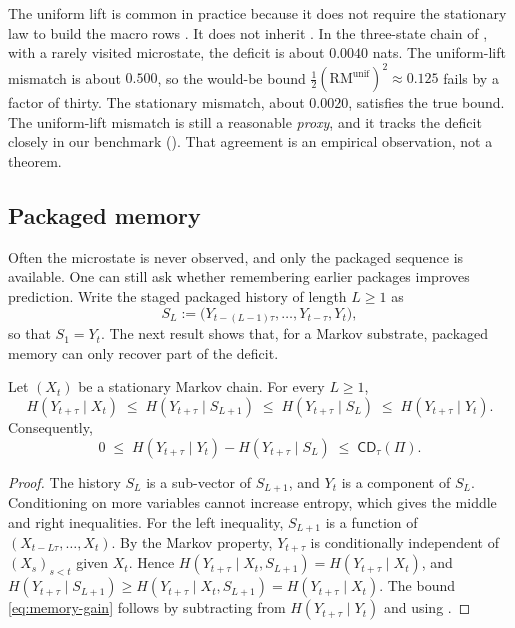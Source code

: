 \begin{remark}\label{rem:uniform-lift}
The uniform lift is common in practice because it does not require the stationary law to build the macro rows \citep{tsiokos2026pica}. It does not inherit . In the three-state chain of , with a rarely visited microstate, the deficit is about $0.0040$ nats. The uniform-lift mismatch is about $0.500$, so the would-be bound $\tfrac12(\mathrm{RM}^{\mathrm{unif}})^2\approx 0.125$ fails by a factor of thirty. The stationary mismatch, about $0.0020$, satisfies the true bound. The uniform-lift mismatch is still a reasonable \emph{proxy}, and it tracks the deficit closely in our benchmark (). That agreement is an empirical observation, not a theorem.
\end{remark}

\subsection{Packaged memory}\label{sec:memory}

Often the microstate is never observed, and only the packaged sequence is available. One can still ask whether remembering earlier packages improves prediction. Write the staged packaged history of length $L\ge1$ as
\[
S_L := \bigl(Y_{t-(L-1)\tau},\dots,Y_{t-\tau},Y_t\bigr),
\]
so that $S_1=Y_t$. The next result shows that, for a Markov substrate, packaged memory can only recover part of the deficit.

\begin{proposition}\label{prop:memory}
Let $(X_t)$ be a stationary Markov chain. For every $L\ge1$,
\begin{equation}
H(Y_{t+\tau}\mid X_t)
\;\le\;
H(Y_{t+\tau}\mid S_{L+1})
\;\le\;
H(Y_{t+\tau}\mid S_L)
\;\le\;
H(Y_{t+\tau}\mid Y_t).
\label{eq:memory-sandwich}
\end{equation}
Consequently,
\begin{equation}
0
\;\le\;
H(Y_{t+\tau}\mid Y_t)-H(Y_{t+\tau}\mid S_L)
\;\le\;
\mathsf{CD}_\tau(\Pi).
\label{eq:memory-gain}
\end{equation}
\end{proposition}

\begin{proof}
The history $S_L$ is a sub-vector of $S_{L+1}$, and $Y_t$ is a component of $S_L$. Conditioning on more variables cannot increase entropy, which gives the middle and right inequalities. For the left inequality, $S_{L+1}$ is a function of $(X_{t-L\tau},\dots,X_t)$. By the Markov property, $Y_{t+\tau}$ is conditionally independent of $(X_s)_{s<t}$ given $X_t$. Hence $H(Y_{t+\tau}\mid X_t,S_{L+1})=H(Y_{t+\tau}\mid X_t)$, and
$H(Y_{t+\tau}\mid S_{L+1})\ge H(Y_{t+\tau}\mid X_t,S_{L+1})=H(Y_{t+\tau}\mid X_t)$.
The bound \eqref{eq:memory-gain} follows by subtracting from $H(Y_{t+\tau}\mid Y_t)$ and using .
\end{proof}


